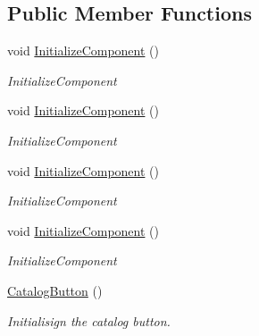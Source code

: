 \subsection*{Public Member Functions}
\begin{DoxyCompactItemize}
\item 
void \mbox{\hyperlink{class_wpf_handler_1_1_u_i_1_1_controls_1_1_catalog_button_abd3ec610152200149f7ac8a4f3d63594}{Initialize\+Component}} ()
\begin{DoxyCompactList}\small\item\em Initialize\+Component \end{DoxyCompactList}\item 
void \mbox{\hyperlink{class_wpf_handler_1_1_u_i_1_1_controls_1_1_catalog_button_abd3ec610152200149f7ac8a4f3d63594}{Initialize\+Component}} ()
\begin{DoxyCompactList}\small\item\em Initialize\+Component \end{DoxyCompactList}\item 
void \mbox{\hyperlink{class_wpf_handler_1_1_u_i_1_1_controls_1_1_catalog_button_abd3ec610152200149f7ac8a4f3d63594}{Initialize\+Component}} ()
\begin{DoxyCompactList}\small\item\em Initialize\+Component \end{DoxyCompactList}\item 
void \mbox{\hyperlink{class_wpf_handler_1_1_u_i_1_1_controls_1_1_catalog_button_abd3ec610152200149f7ac8a4f3d63594}{Initialize\+Component}} ()
\begin{DoxyCompactList}\small\item\em Initialize\+Component \end{DoxyCompactList}\item 
\mbox{\hyperlink{class_wpf_handler_1_1_u_i_1_1_controls_1_1_catalog_button_a448a9b9dc299b55303d67f4e4b13c2d7}{Catalog\+Button}} ()
\begin{DoxyCompactList}\small\item\em Initialisign the catalog button. \end{DoxyCompactList}\end{DoxyCompactItemize}
